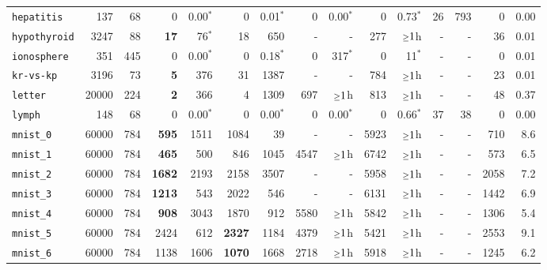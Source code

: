 \begin{tabular}{lccrrrrrrrrrrrr}
\texttt{hepatitis} & \multicolumn{1}{r}{137} & \multicolumn{1}{r}{68}  & 0 & 0.00$^*$ & 0 & 0.01$^*$ & 0 & 0.00$^*$ & 0 & 0.73$^*$ & 26 & 793 & 0 & 0.00\\
\texttt{hypothyroid} & \multicolumn{1}{r}{3247} & \multicolumn{1}{r}{88}  & \textbf{17} & 76$^*$ & 18 & 650 & - & - & 277 & $\mathsmaller{\geq}1$h & - & - & 36 & 0.01\\
\texttt{ionosphere} & \multicolumn{1}{r}{351} & \multicolumn{1}{r}{445}  & 0 & 0.00$^*$ & 0 & 0.18$^*$ & 0 & 317$^*$ & 0 & 11$^*$ & - & - & 0 & 0.01\\
\texttt{kr-vs-kp} & \multicolumn{1}{r}{3196} & \multicolumn{1}{r}{73}  & \textbf{5} & 376 & 31 & 1387 & - & - & 784 & $\mathsmaller{\geq}1$h & - & - & 23 & 0.01\\
\texttt{letter} & \multicolumn{1}{r}{20000} & \multicolumn{1}{r}{224}  & \textbf{2} & 366 & 4 & 1309 & 697 & $\mathsmaller{\geq}1$h & 813 & $\mathsmaller{\geq}1$h & - & - & 48 & 0.37\\
\texttt{lymph} & \multicolumn{1}{r}{148} & \multicolumn{1}{r}{68}  & 0 & 0.00$^*$ & 0 & 0.00$^*$ & 0 & 0.00$^*$ & 0 & 0.66$^*$ & 37 & 38 & 0 & 0.00\\
\texttt{mnist\_0} & \multicolumn{1}{r}{60000} & \multicolumn{1}{r}{784}  & \textbf{595} & 1511 & 1084 & 39 & - & - & 5923 & $\mathsmaller{\geq}1$h & - & - & 710 & 8.6\\
\texttt{mnist\_1} & \multicolumn{1}{r}{60000} & \multicolumn{1}{r}{784}  & \textbf{465} & 500 & 846 & 1045 & 4547 & $\mathsmaller{\geq}1$h & 6742 & $\mathsmaller{\geq}1$h & - & - & 573 & 6.5\\
\texttt{mnist\_2} & \multicolumn{1}{r}{60000} & \multicolumn{1}{r}{784}  & \textbf{1682} & 2193 & 2158 & 3507 & - & - & 5958 & $\mathsmaller{\geq}1$h & - & - & 2058 & 7.2\\
\texttt{mnist\_3} & \multicolumn{1}{r}{60000} & \multicolumn{1}{r}{784}  & \textbf{1213} & 543 & 2022 & 546 & - & - & 6131 & $\mathsmaller{\geq}1$h & - & - & 1442 & 6.9\\
\texttt{mnist\_4} & \multicolumn{1}{r}{60000} & \multicolumn{1}{r}{784}  & \textbf{908} & 3043 & 1870 & 912 & 5580 & $\mathsmaller{\geq}1$h & 5842 & $\mathsmaller{\geq}1$h & - & - & 1306 & 5.4\\
\texttt{mnist\_5} & \multicolumn{1}{r}{60000} & \multicolumn{1}{r}{784}  & 2424 & 612 & \textbf{2327} & 1184 & 4379 & $\mathsmaller{\geq}1$h & 5421 & $\mathsmaller{\geq}1$h & - & - & 2553 & 9.1\\
\texttt{mnist\_6} & \multicolumn{1}{r}{60000} & \multicolumn{1}{r}{784}  & 1138 & 1606 & \textbf{1070} & 1668 & 2718 & $\mathsmaller{\geq}1$h & 5918 & $\mathsmaller{\geq}1$h & - & - & 1245 & 6.2\\

\end{tabular}
